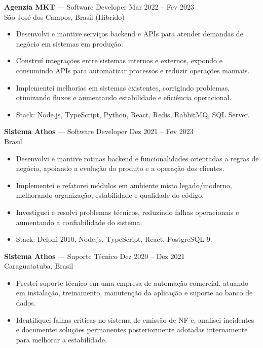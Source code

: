 \documentclass[11pt,a4paper]{article}
\begin{document}
\vspace{8pt}
\textbf{Agenzia MKT} — Software Developer \hfill Mar 2022 – Fev 2023 \\
São José dos Campos, Brasil (Híbrido)
\vspace{-4pt}
\begin{itemize}[leftmargin=*]
  \item Desenvolvi e mantive serviços backend e APIs para atender demandas de negócio em sistemas em produção.
  \item Construí integrações entre sistemas internos e externos, expondo e consumindo APIs para automatizar processos e reduzir operações manuais.
  \item Implementei melhorias em sistemas existentes, corrigindo problemas, otimizando fluxos e aumentando estabilidade e eficiência operacional.
  \item Stack: Node.js, TypeScript, Python, React, Redis, RabbitMQ, SQL Server.
\end{itemize}

\vspace{8pt}
\textbf{Sistema Athos} — Software Developer \hfill Dez 2021 – Fev 2023 \\
Brasil
\vspace{-4pt}
\begin{itemize}[leftmargin=*]
  \item Desenvolvi e mantive rotinas backend e funcionalidades orientadas a regras de negócio, apoiando a evolução do produto e a operação dos clientes.
  \item Implementei e refatorei módulos em ambiente misto legado/moderno, melhorando organização, estabilidade e qualidade do código.
  \item Investiguei e resolvi problemas técnicos, reduzindo falhas operacionais e aumentando a confiabilidade do sistema.
  \item Stack: Delphi 2010, Node.js, TypeScript, React, PostgreSQL 9.
\end{itemize}

\vspace{8pt}
\textbf{Sistema Athos} — Suporte Técnico \hfill Dez 2020 – Dez 2021 \\
Caraguatatuba, Brasil
\vspace{-4pt}
\begin{itemize}[leftmargin=*]
  \item Prestei suporte técnico em uma empresa de automação comercial, atuando em instalação, treinamento, manutenção da aplicação e suporte ao banco de dados.
  \item Identifiquei falhas críticas no sistema de emissão de NF-e, analisei incidentes e documentei soluções permanentes posteriormente adotadas internamente para melhorar a estabilidade.
\end{itemize}
\end{document}
